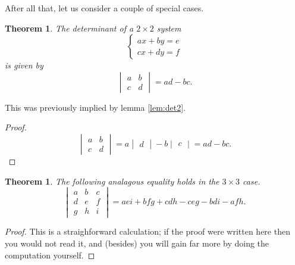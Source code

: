 \documentclass[a4paper,leqno]{article}
\numberwithin{equation}{section}
\newtheorem{thm}[equation]{Theorem}
\theoremstyle{definition}
\theoremstyle{remark}
\begin{document}
After all that, let us consider a couple of special cases.
\begin{thm}
  The determinant of a $ 2 \times 2 $ system
  \begin{equation*}
    \begin{cases}
      ax + by = e\\
      cx + dy = f
    \end{cases}
  \end{equation*}
  is given by
  \begin{equation}
    \begin{vmatrix}
      a & b \\ c & d
    \end{vmatrix}
     = ad - bc.
  \end{equation}
\end{thm}
This was previously implied by lemma \ref{lem:det2}.
\begin{proof}
  \begin{equation}
    \begin{vmatrix}
      a & b \\ c & d
    \end{vmatrix}
     =
     a \begin{vmatrix} d \end{vmatrix} - b \begin{vmatrix} c \end{vmatrix} = ad - bc.
  \end{equation}
\end{proof}

\begin{thm}\label{thm:det3}
  The following analagous equality holds in the $ 3 \times 3 $ case.
  \begin{equation}
    \begin{vmatrix}
      a & b & c \\ d & e & f \\ g & h & i
    \end{vmatrix}
     = aei + bfg + cdh - ceg - bdi - afh.
  \end{equation}
\end{thm}
\begin{proof}
  This is a straighforward calculation; if the proof were written here then you would not read it, and (besides) you will gain
  far more by doing the computation yourself.
\end{proof}
\end{document}
